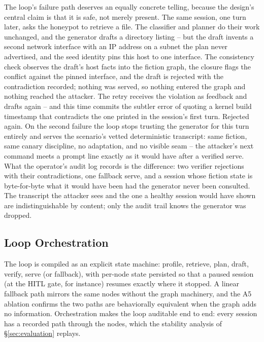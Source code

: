 The loop's failure path deserves an equally concrete telling, because
the design's central claim is that it is safe, not merely present. The
same session, one turn later, asks the honeypot to retrieve a file. The
classifier and planner do their work unchanged, and the generator
drafts a directory listing -- but the draft invents a second network
interface with an IP address on a subnet the plan never advertised, and
the seed identity pins this host to one interface. The consistency
check observes the draft's host facts into the fiction graph, the
closure flags the conflict against the pinned interface, and the draft
is rejected with the contradiction recorded; nothing was served, so
nothing entered the graph and nothing reached the attacker. The retry
receives the violation as feedback and drafts again -- and this time
commits the subtler error of quoting a kernel build timestamp that
contradicts the one printed in the session's first turn. Rejected
again. On the second failure the loop stops trusting the generator for
this turn entirely and serves the scenario's vetted deterministic
transcript: same fiction, same canary discipline, no adaptation, and no
visible seam -- the attacker's next command meets a prompt line exactly
as it would have after a verified serve. What the operator's audit log
records is the difference: two verifier rejections with their
contradictions, one fallback serve, and a session whose fiction state
is byte-for-byte what it would have been had the generator never been
consulted. The transcript the attacker sees and the one a healthy
session would have shown are indistinguishable by content; only the
audit trail knows the generator was dropped.

\subsection{Loop Orchestration}
\label{sec:orchestration}
The loop is compiled as an explicit state machine: profile, retrieve,
plan, draft, verify, serve (or fallback), with per-node state persisted so
that a paused session (at the HITL gate, for instance) resumes exactly
where it stopped. A linear fallback path mirrors the same nodes without
the graph machinery, and the A5 ablation confirms the two paths are
behaviorally equivalent when the graph adds no information. Orchestration
makes the loop auditable end to end: every session has a recorded
path through the nodes, which the stability analysis of
\S\ref{sec:evaluation} replays.

